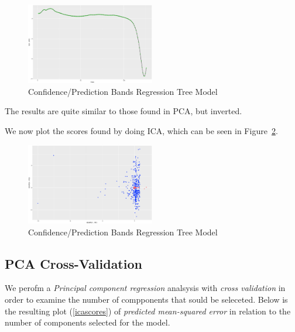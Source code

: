 \documentclass[a4paper, twocolumn]{article}
\begin{document}
        \begin{figure}[h!]
            \centering
            \caption{Confidence/Prediction Bands Regression Tree Model}
            \label{fig:x752ical}
            \includegraphics[width=0.5\textwidth]{share/A2_trace_ICA2.eps}
        \end{figure}

        The results are quite similar to those found in PCA, but inverted.

        We now plot the scores found by doing ICA, which can be seen in Figure~\ref{fig:icascores}.

        \begin{figure}[h!]
            \centering
            \caption{Confidence/Prediction Bands Regression Tree Model}
            \label{fig:icascores}
            \includegraphics[width=0.5\textwidth]{share/A2_icascore.eps}
        \end{figure}

    \subsection*{PCA Cross-Validation}

 		We perofm a \emph{Principal component regression} analsysis with \emph{cross validation} in order to examine the number of compponents that sould be seleceted. Below is the resulting plot (\ref{icascores}) of \emph{predicted mean-squared error} in relation to the number of components selected for the model.
\end{document}
